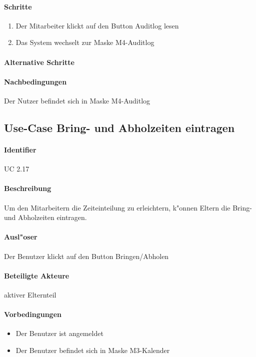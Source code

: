   \paragraph{Schritte}
  \begin{enumerate}
   \item Der Mitarbeiter klickt auf den Button \dq Auditlog lesen\dq
   \item Das System wechselt zur Maske M4-Auditlog
  \end{enumerate}
  \paragraph{Alternative Schritte}
  \paragraph{Nachbedingungen}
  Der Nutzer befindet sich in Maske M4-Auditlog

  
  \newpage
 \subsection{Use-Case Bring- und Abholzeiten eintragen}
  \paragraph{Identifier}
  UC 2.17
  \paragraph{Beschreibung}
  Um den Mitarbeitern die Zeiteinteilung zu erleichtern, k"onnen Eltern die Bring- und Abholzeiten eintragen.
  \paragraph{Ausl"oser}
  Der Benutzer klickt auf den Button \dq Bringen/Abholen\dq
  \paragraph{Beteiligte Akteure}   \leavevmode \newline
    aktiver Elternteil
  \paragraph{Vorbedingungen}
  \begin{itemize}
   \item Der Benutzer ist angemeldet
   \item Der Benutzer befindet sich in Maske M3-Kalender
  \end{itemize}

